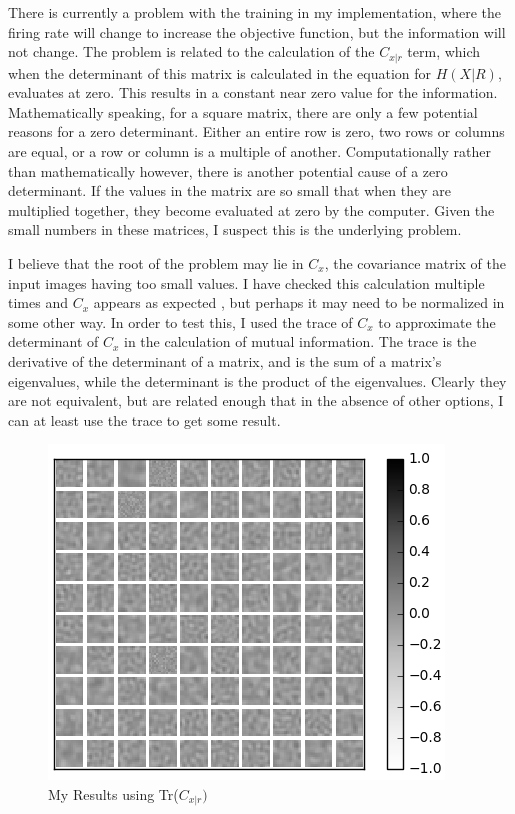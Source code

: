 \documentclass{article}
\begin{document}
There is currently a problem with the training in my implementation, where the firing rate will change to increase the objective function, but the information will not change. The problem is related to the calculation of the $C_{x|r}$ term, which when the determinant of this matrix is calculated in the equation for $H(X|R)$, evaluates at zero. This results in a constant near zero value for the information. Mathematically speaking, for a square matrix, there are only a few potential reasons for a zero determinant. Either an entire row is zero, two rows or columns are equal, or a row or column is a multiple of another. Computationally rather than mathematically however, there is another potential cause of a zero determinant.  If the values in the matrix are so small that when they are multiplied together, they become evaluated at zero by the computer. Given the small numbers in these matrices, I suspect this is the underlying problem. \par
	I believe that the root of the problem may lie in $C_x$, the covariance matrix of the input images having too small values. I have checked this calculation multiple times and $C_x$ appears as expected \cite{fig:covx}, but perhaps it may need to be normalized in some other way. In order to test this, I used the trace of $C_x$ to approximate the determinant of $C_x$ in the calculation of mutual information. The trace is the derivative of the determinant of a matrix, and is the sum of a matrix’s eigenvalues, while the determinant is the product of the eigenvalues. Clearly they are not equivalent, but are related enough that in the absence of other options, I can at least use the trace to get some result. \par

\begin{figure}
  \centering
    \includegraphics[width=1\linewidth]{traceresults.png}
  \caption{My Results using Tr($C_{x|r})$}
  \label{fig:traceresults}
\end{figure}
\end{document}
